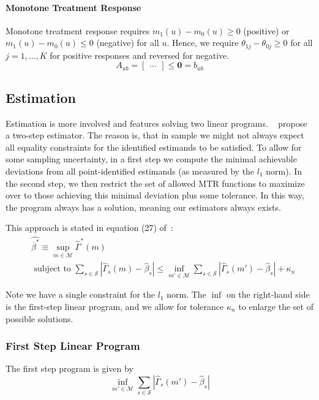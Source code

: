\documentclass[12pt,a4paper,english]{article} %
\numberwithin{equation}{section}
\numberwithin{figure}{section}
\numberwithin{table}{section}
\begin{document}
\paragraph{Monotone Treatment Response}
Monotone treatment response requires $m_1(u) - m_0(u) \geq 0$ (positive) or $m_1(u) - m_0(u) \leq 0$ (negative) for all $u$.
Hence, we require $\theta_{1j} - \theta_{0j} \geq 0$ for all $j=1,\ldots,K$ for positive responses and reversed for negative.
\begin{equation*}
  A_{ub} =
  \begin{bmatrix}
    \ldots
  \end{bmatrix} \leq \mathbf{0} = b_{ub}
\end{equation*}

\subsection{Estimation}
Estimation is more involved and features solving two linear programs.
~\cite{mogstad2018using} propose a two-step estimator.
The reason is, that in sample we might not always expect all equality constraints for the identified estimands to be satisfied.
To allow for some sampling uncertainty, in a first step we compute the minimal achievable deviations from all point-identified estimands (as measured by the $l_1$ norm).
In the second step, we then restrict the set of allowed MTR functions to maximize over to those achieving this minimal deviation plus some tolerance.
In this way, the program always has a solution, meaning our estimators always exists.

This approach is stated in equation (27) of~\cite{mogstad2018using}:
\begin{align}
  & \hat{\overline{\beta}^*} \equiv \sup_{m\in \mathcal{M}}\hat{\Gamma}^*(m) \\
  & \text{ subject to } \sum_{s\in\mathcal{S}}|\hat{\Gamma}_s(m) - \hat{\beta}_s| \leq \inf_{m'\in \mathcal{M}} \sum_{s\in\mathcal{S}}|\hat{\Gamma}_s(m') - \hat{\beta}_s| + \kappa_n
\end{align}

Note we have a single constraint for the $l_1$ norm.
The $\inf$ on the right-hand side is the first-step linear program, and we allow for tolerance $\kappa_n$ to enlarge the set of possible solutions.

\subsubsection{First Step Linear Program}
The first step program is given by
\begin{equation*}
  \inf_{m'\in \mathcal{M}} \sum_{s\in\mathcal{S}}|\hat{\Gamma}_s(m') - \hat{\beta}_s|
\end{equation*}
\end{document}
